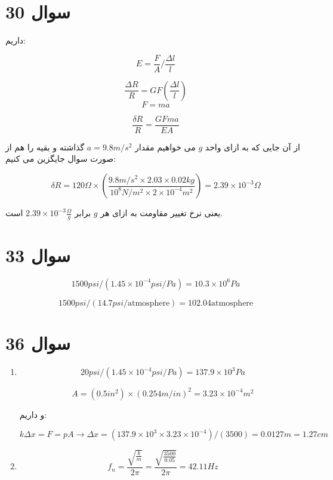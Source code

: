 \documentclass[12pt]{article}
\begin{document}
\section*{سوال 30}

داریم:

$$E = \frac{F}{A} / \frac{\Delta l}{l}$$

$$\frac{\Delta R} { R} = GF (\frac{\Delta l}{l})$$
$$F=ma$$

$$\frac{\delta R}{R} = \frac{GF m a}{E A}$$

از آن جایی که به ازای واحد $g$ می خواهیم مقدار $a=9.8m/s^2$ گذاشته و بقیه را هم از صورت سوال جایگزین می کنیم:

$$\delta R = 120 \Omega \times (\frac{9.8 m/s^2 \times 2.03 \times0.02 kg }{10^8 N/m^2 \times 2 \times 10^{-4} m^2}) = 2.39 \times 10^{-3} \Omega$$

یعنی نرخ تغییر مقاومت به ازای هر $g$ برابر 
$2.39 \times 10^{-3} \frac{\Omega}{g}$
است.


\section*{سوال 33}

$$1500 psi / (1.45 \times 10^{-4} psi/Pa) = 10.3 \times 10^6 Pa$$

$$1500 psi / (14.7 psi /\text{atmosphere}) =  102.04 \text{atmosphere}$$


\section*{سوال 36}

\begin{enumerate}
	\item 
	$$20psi / (1.45 \times 10^{-4} psi/Pa)= 137.9 \times 10^3 Pa$$
	
	$$A = (0.5 in^2) \times (0.254 m/in)^2 = 3.23 \times 10^{-4} m^2$$
	
	و داریم:
	
	$$k \Delta x = F = p A \rightarrow \Delta x = (137.9 \times 10^3 \times 3.23 \times 10^{-4})/(3500) = 0.0127 m = 1.27 cm$$
	
	\item
$$f_n = \frac{\sqrt{\frac{k}{m}}}{2 \pi } = \frac{\sqrt{\frac{3500}{0.05}}}{2 \pi } = 42.11 Hz$$
\end{enumerate}
\end{document}
